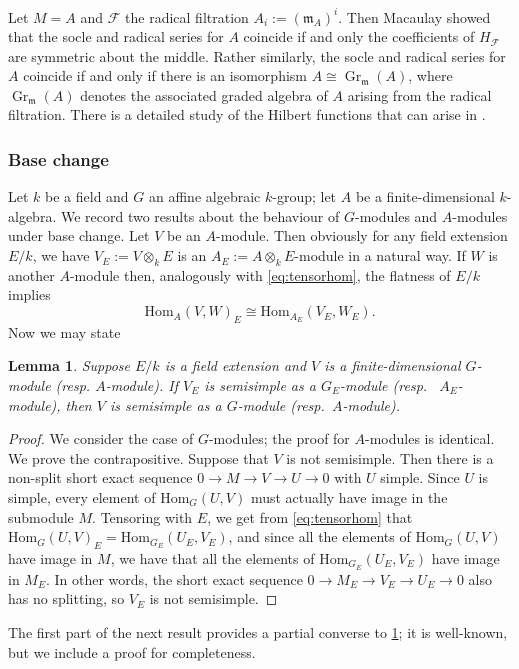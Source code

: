 \documentclass[11pt,reqno]{amsart}
\newtheorem{lemma}{Lemma}[subsection]
\theoremstyle{definition}
\theoremstyle{remark}
\theoremstyle{definition}
\theoremstyle{plain}
\DeclareMathOperator{\Gr}{Gr}
\newcommand{\Hom}{\mathrm{Hom}}
\newcommand{\m}{\mathfrak{m}}
\begin{document}
Let $M=A$ and $\mathscr{F}$ the radical filtration $A_i:=(\m_A)^i$. 
Then Macaulay showed that the socle and radical series for $A$ coincide if and only the coefficients of $H_{\mathscr{F}}$ are symmetric about the middle. 
Rather similarly, the socle and radical series for $A$ coincide if and only if there is an isomorphism $A\cong\Gr_\m(A)$, where $\Gr_\m(A)$ denotes the associated graded algebra of $A$ arising from the radical filtration. There is a detailed study of the Hilbert functions that can arise in \cite{Iar94}.

\subsubsection{Base change}
Let $k$ be a field and $G$ an affine algebraic $k$-group; let $A$ be a finite-dimensional $k$-algebra. We record two results about the behaviour of $G$-modules and $A$-modules under base change. Let $V$ be an $A$-module. Then obviously for any field extension $E/k$, we have $V_E:=V\otimes_kE$ is an $A_E:=A\otimes_k E$-module in a natural way. If $W$ is another $A$-module then, analogously with \cref{eq:tensorhom}, the flatness of $E/k$ implies \[\Hom_A(V,W)_E\cong\Hom_{A_E}(V_E,W_E).\] Now we may state 

\begin{lemma}\label{lem:semisimpledown}
Suppose $E/k$ is a field extension and $V$ is a finite-dimensional $G$-module (resp. $A$-module).
If $V_{E}$ is semisimple as a $G_{E}$-module (resp.~ $A_E$-module), then $V$ is semisimple as a $G$-module (resp.~$A$-module).
\end{lemma}

\begin{proof}
We consider the case of $G$-modules; the proof for $A$-modules is identical. We prove the contrapositive.
Suppose that $V$ is not semisimple.
Then there is a non-split short exact sequence $0\to M \to V \to U \to 0$ with $U$ simple.
Since $U$ is simple, every element of $\Hom_G(U,V)$ must actually have image in the submodule $M$. 
Tensoring with $E$, we get from \eqref{eq:tensorhom} that $\Hom_G(U,V)_{E} = \Hom_{G_{E}}(U_{E},V_{E})$,
and since all the elements of $\Hom_G(U,V)$ have image in $M$, we have that all the elements of $\Hom_{G_{E}}(U_{E},V_{E})$
have image in $M_{E}$.
In other words, the short exact sequence $0\to M_{E} \to V_{E} \to U_{E} \to 0$ also has no splitting, so $V_{E}$ is not semisimple.
\end{proof}

The first part of the next result provides a partial converse to \cref{lem:semisimpledown}; it is well-known, but we include a proof for completeness.
\end{document}
